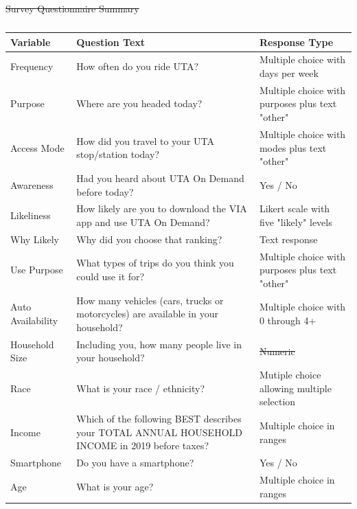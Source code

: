 \documentclass[smartcities,article,submit,moreauthors,pdftex]{mdpi} %
\providecommand{\DIFadd}[1]{{\protect\color{blue}\uwave{#1}}} %
\providecommand{\DIFdel}[1]{{\protect\color{red}\sout{#1}}}                      %
\providecommand{\DIFdelbegin}{} %
\providecommand{\DIFaddFL}[1]{\DIFadd{#1}} %
\providecommand{\DIFdelFL}[1]{\DIFdel{#1}} %
\providecommand{\DIFaddbeginFL}{} %
\providecommand{\DIFaddendFL}{} %
\providecommand{\DIFdelbeginFL}{} %
\providecommand{\DIFdelendFL}{} %
\begin{document}
\DIFdelbegin %
\DIFdelendFL \DIFaddbeginFL \begin{table}

\caption{\label{tab:survey-questions}\DIFaddFL{Survey Questionnaire Summary}}
\DIFaddendFL \centering
\DIFdelbeginFL %
{%
\DIFdelFL{Survey Questionnaire Summary}}
\DIFdelendFL \DIFaddbeginFL \begin{tabular}[t]{lp{}p{}}
\DIFaddendFL \toprule
Variable & Question Text & Response Type\\
\midrule
Frequency & How often do you ride UTA? & Multiple choice with days per week\\
Purpose & Where are you headed today? & Multiple choice with purposes plus text "other"\\
Access Mode & How did you travel to your UTA stop/station today? & Multiple choice with modes plus text "other"\\
Awareness & Had you heard about UTA On Demand before today? & Yes / No\\
Likeliness & How likely are you to download the VIA app and use UTA On Demand? & Likert scale with five "likely" levels\\
\DIFaddbeginFL \addlinespace
\DIFaddendFL Why Likely & Why did you choose that ranking? & Text response\\
Use Purpose & What types of trips do you think you could use it for? & Multiple choice with purposes plus text "other"\\
Auto Availability & How many vehicles (cars, trucks or motorcycles) are available in your household? & Multiple choice with 0 through 4+\\
Household Size & Including you, how many people live in your household? & \DIFdelbeginFL \DIFdelFL{Numeric                                           }\DIFdelendFL \DIFaddbeginFL \DIFaddFL{Multiple choice with 0 through 4+}\DIFaddendFL \\
Race & What is your race / ethnicity? & Mutiple choice allowing multiple selection\\
\DIFaddbeginFL \addlinespace
\DIFaddendFL Income & Which of the following BEST describes your TOTAL ANNUAL HOUSEHOLD INCOME in 2019 before taxes? & Multiple choice in ranges\\
Smartphone & Do you have a smartphone? & Yes / No\\
Age & What is your age? & Multiple choice in ranges\\
\bottomrule
\end{tabular}
\end{table}
\end{document}
